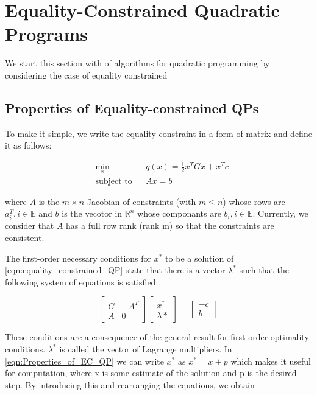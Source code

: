 \section{Equality-Constrained Quadratic Programs}

We start this section with of algorithms for quadratic programming by considering the case of equality constrained

\subsection*{Properties of Equality-constrained QPs}
To make it simple, we write the equality constraint in a form of matrix and define it as follows:

\begin{equation}
\begin{aligned}
& \underset{x}{\text{min}}
& & q(x)= \frac{1}{2}x^{T}Gx+x^{T}c \\
& \text{subject to} & &  Ax=b
\end{aligned}
\label{eqn:equality_constrained_QP}
\end{equation}

where $A$ is the $m\times n$ Jacobian of constraints (with $m\leqslant n$) whose rows are $a_i^T,i \in \mathbb{E}$ and $b$ is the vecotor in $\mathbb{R}^n$ whose componants are $b_i, i \in \mathbb{E}$. Currently, we consider that $A$ has a full row rank (rank m) so that the constraints are consistent.

The first-order necessary conditions for $x^*$ to be a solution of \ref{eqn:equality_constrained_QP} state that there is a vector $\lambda^*$ such that the following system of equations is satisfied:

\begin{equation}
\begin{bmatrix}
  	G & -A^T \\
    A & 0
  \end{bmatrix}
  \begin{bmatrix}
  	x^* \\
    \lambda{*}
  \end{bmatrix}
  =
  \begin{bmatrix}
  	-c \\
    b
  \end{bmatrix}	
  \label{eqn:Properties_of_EC_QP}
\end{equation}

These conditions are a consequence of the general result for first-order optimality conditions.  $\lambda^*$ is called the vector of Lagrange multipliers. In \ref{eqn:Properties_of_EC_QP} we can write $x^*$ as $x^* = x+p$ which makes it useful for computation, where x is some estimate of the solution and p is the desired step. By introducing this and rearranging the equations, we obtain

